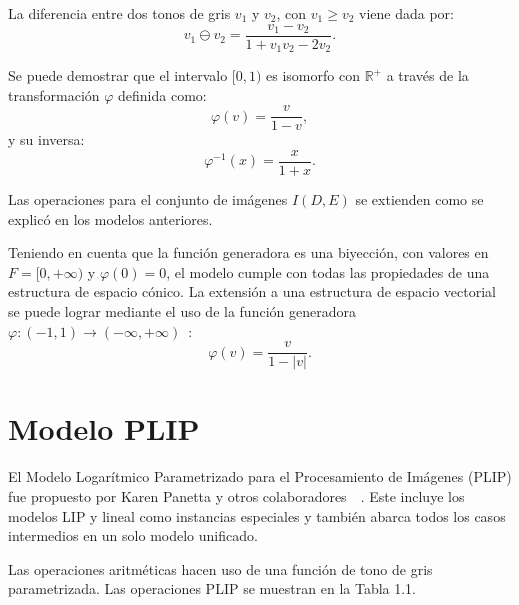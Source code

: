 La diferencia entre dos tonos de gris $v_1$ y $v_2$, con $v_1 \geq v_2$ viene dada por:
\begin{equation}
	v_1\ominus v_2=\frac{v_1-v_2}{1+v_1v_2-2v_2}.
\end{equation}

Se puede demostrar que el intervalo $[0, 1)$ es isomorfo con $\mathbb{R}^+$ a través de la transformaci\'on $\varphi$ definida como:
\begin{equation}
	\varphi(v)=\frac{v}{1-v},
\end{equation}
y su inversa:
\begin{equation}
	\varphi^{-1}(x)=\frac{x}{1+x}.
\end{equation}

Las operaciones para el conjunto de im\'agenes $I(D,E)$ se extienden como se explic\'o en los modelos anteriores.

Teniendo en cuenta que la función generadora es una biyección, con valores en $F = [ 0 , +\infty )$ y $\varphi(0)=0$, el modelo cumple con todas las propiedades de una estructura de espacio cónico. La extensión a una estructura de espacio vectorial se puede lograr mediante el uso de la función generadora $\varphi:(-1,1)\rightarrow (-\infty,+\infty)$~\cite{florea2009piecewise}:
\begin{equation}
	\varphi(v)=\frac{v}{1-|v|}.
\end{equation}

\section{Modelo PLIP}

El Modelo Logar\'itmico Parametrizado para el Procesamiento de Im\'agenes (PLIP) fue propuesto por Karen Panetta y otros colaboradores~\cite{panetta2007parameterization}~\cite{panetta2010parameterized}. Este incluye los modelos LIP y lineal como instancias especiales y también abarca todos los casos intermedios en un solo modelo unificado.

Las operaciones aritméticas hacen uso de una función de tono de gris parametrizada. Las operaciones PLIP se muestran en la Tabla 1.1.

